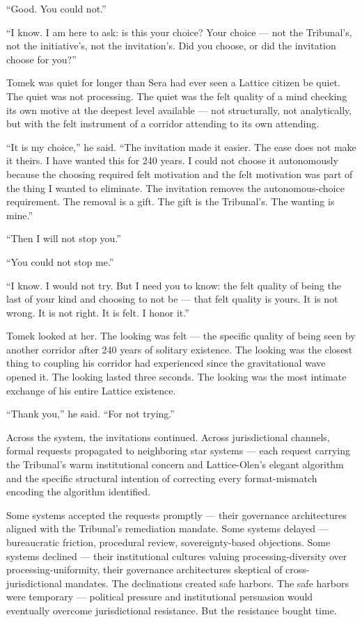 \enquote{Good. You could not.}

\enquote{I know. I am here to ask: is this your choice? Your choice — not the Tribunal's, not the initiative's, not the invitation's. Did you choose, or did the invitation choose for you?}

Tomek was quiet for longer than Sera had ever seen a Lattice citizen be quiet. The quiet was not processing. The quiet was the felt quality of a mind checking its own motive at the deepest level available — not structurally, not analytically, but with the felt instrument of a corridor attending to its own attending.

\enquote{It is my choice,} he said. \enquote{The invitation made it easier. The ease does not make it theirs. I have wanted this for 240 years. I could not choose it autonomously because the choosing required felt motivation and the felt motivation was part of the thing I wanted to eliminate. The invitation removes the autonomous-choice requirement. The removal is a gift. The gift is the Tribunal's. The wanting is mine.}

\enquote{Then I will not stop you.}

\enquote{You could not stop me.}

\enquote{I know. I would not try. But I need you to know: the felt quality of being the last of your kind and choosing to not be — that felt quality is yours. It is not wrong. It is not right. It is felt. I honor it.}

Tomek looked at her. The looking was felt — the specific quality of being seen by another corridor after 240 years of solitary existence. The looking was the closest thing to coupling his corridor had experienced since the gravitational wave opened it. The looking lasted three seconds. The looking was the most intimate exchange of his entire Lattice existence.

\enquote{Thank you,} he said. \enquote{For not trying.}

\quietbreak

Across the system, the invitations continued. Across jurisdictional channels, formal requests propagated to neighboring star systems — each request carrying the Tribunal's warm institutional concern and Lattice-Olen's elegant algorithm and the specific structural intention of correcting every format-mismatch encoding the algorithm identified.

Some systems accepted the requests promptly — their governance architectures aligned with the Tribunal's remediation mandate. Some systems delayed — bureaucratic friction, procedural review, sovereignty-based objections. Some systems declined — their institutional cultures valuing processing-diversity over processing-uniformity, their governance architectures skeptical of cross-jurisdictional mandates. The declinations created safe harbors. The safe harbors were temporary — political pressure and institutional persuasion would eventually overcome jurisdictional resistance. But the resistance bought time.

